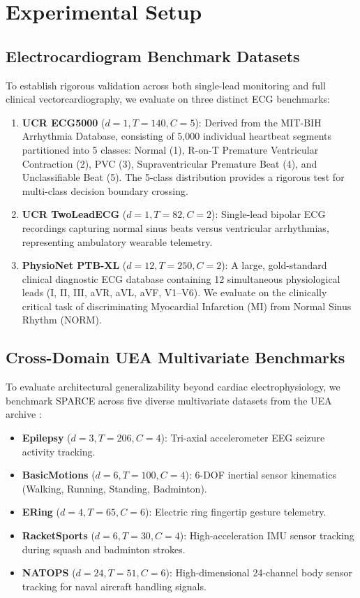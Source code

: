 \documentclass[conference]{IEEEtran}
\begin{document}
\section{Experimental Setup}

\subsection{Electrocardiogram Benchmark Datasets}
To establish rigorous validation across both single-lead monitoring and full clinical vectorcardiography, we evaluate on three distinct ECG benchmarks:
\begin{enumerate}
    \item \textbf{UCR ECG5000} ($d=1, T=140, C=5$): Derived from the MIT-BIH Arrhythmia Database, consisting of 5,000 individual heartbeat segments partitioned into 5 classes: Normal (1), R-on-T Premature Ventricular Contraction (2), PVC (3), Supraventricular Premature Beat (4), and Unclassifiable Beat (5). The 5-class distribution provides a rigorous test for multi-class decision boundary crossing.
    \item \textbf{UCR TwoLeadECG} ($d=1, T=82, C=2$): Single-lead bipolar ECG recordings capturing normal sinus beats versus ventricular arrhythmias, representing ambulatory wearable telemetry.
    \item \textbf{PhysioNet PTB-XL} ($d=12, T=250, C=2$): A large, gold-standard clinical diagnostic ECG database containing 12 simultaneous physiological leads (I, II, III, aVR, aVL, aVF, V1--V6). We evaluate on the clinically critical task of discriminating Myocardial Infarction (MI) from Normal Sinus Rhythm (NORM).
\end{enumerate}

\subsection{Cross-Domain UEA Multivariate Benchmarks}
To evaluate architectural generalizability beyond cardiac electrophysiology, we benchmark SPARCE across five diverse multivariate datasets from the UEA archive \cite{bagnall2017uea}:
\begin{itemize}
    \item \textbf{Epilepsy} ($d=3, T=206, C=4$): Tri-axial accelerometer EEG seizure activity tracking.
    \item \textbf{BasicMotions} ($d=6, T=100, C=4$): 6-DOF inertial sensor kinematics (Walking, Running, Standing, Badminton).
    \item \textbf{ERing} ($d=4, T=65, C=6$): Electric ring fingertip gesture telemetry.
    \item \textbf{RacketSports} ($d=6, T=30, C=4$): High-acceleration IMU sensor tracking during squash and badminton strokes.
    \item \textbf{NATOPS} ($d=24, T=51, C=6$): High-dimensional 24-channel body sensor tracking for naval aircraft handling signals.
\end{itemize}
\end{document}
